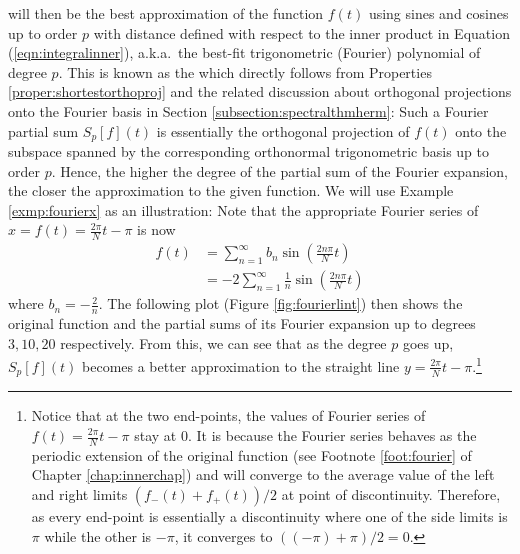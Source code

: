 will then be the best approximation of the function $f(t)$ using sines and cosines up to order $p$ with distance defined with respect to the inner product in Equation (\ref{eqn:integralinner}), a.k.a.\ the best-fit trigonometric (Fourier) polynomial of degree $p$. This is known as the  which directly follows from Properties \ref{proper:shortestorthoproj} and the related discussion about orthogonal projections onto the Fourier basis in Section \ref{subsection:spectralthmherm}: Such a Fourier partial sum $S_p[f](t)$ is essentially the orthogonal projection of $f(t)$ onto the subspace spanned by the corresponding orthonormal trigonometric basis up to order $p$. Hence, the higher the degree of the partial sum of the Fourier expansion, the closer the approximation to the given function. We will use Example \ref{exmp:fourierx} as an illustration: Note that the appropriate Fourier series of $x = f(t) = \frac{2\pi}{N}t - \pi$ is now
\begin{align*}
f(t) &= \sum_{n=1}^{\infty} b_n \sin(\frac{2n\pi}{N}t) \\
&= -2 \sum_{n=1}^{\infty} \frac{1}{n} \sin(\frac{2n\pi}{N}t)
\end{align*}
where $b_n = -\frac{2}{n}$. The following plot (Figure \ref{fig:fourierlint}) then shows the original function and the partial sums of its Fourier expansion up to degrees $3,10,20$ respectively. From this, we can see that as the degree $p$ goes up, $S_p[f](t)$ becomes a better approximation to the straight line $y = \frac{2\pi}{N}t - \pi$.\footnote{Notice that at the two end-points, the values of Fourier series of $f(t) = \frac{2\pi}{N}t - \pi$ stay at $0$. It is because the Fourier series behaves as the periodic extension of the original function (see Footnote \ref{foot:fourier} of Chapter \ref{chap:innerchap}) and will converge to the average value of the left and right limits $(f_-(t) + f_+(t))/2$ at point of discontinuity. Therefore, as every end-point is essentially a discontinuity where one of the side limits is $\pi$ while the other is $-\pi$, it converges to $((-\pi) + \pi)/2 = 0$.}
